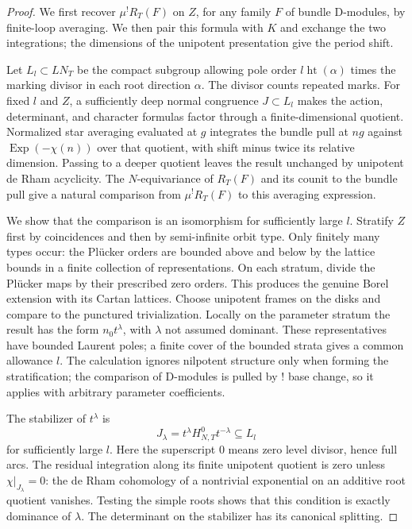 \begin{proof}
We first recover $\mu^!R_T(F)$ on $Z$, for any family $F$ of bundle
D-modules, by finite-loop averaging.  We then pair this formula with
$K$ and exchange the two integrations; the dimensions of the unipotent
presentation give the period shift.

Let $L_l\subset LN_T$ be the compact subgroup
allowing pole order $l\operatorname{ht}(\alpha)$ times the marking
divisor in each root direction $\alpha$.  The divisor counts repeated
marks.  For fixed $l$ and $Z$, a sufficiently deep normal congruence
$J\subset L_l$ makes the action, determinant, and character formulas
factor through a finite-dimensional quotient.  Normalized star
averaging evaluated at $g$ integrates the bundle pull at $ng$
against $\operatorname{Exp}(-\chi(n))$ over that quotient, with shift
minus twice its relative dimension.  Passing to a deeper quotient
leaves the result unchanged by unipotent de Rham acyclicity.  The
$N$-equivariance of $R_T(F)$ and its counit to the bundle pull give a
natural comparison from $\mu^!R_T(F)$ to this averaging expression.

We show that the comparison is an isomorphism for sufficiently large
$l$.  Stratify $Z$ first by coincidences and then by semi-infinite orbit
type.  Only finitely many types occur: the Pl\"ucker orders are bounded
above and below by the lattice bounds in a finite collection of
representations.  On each stratum, divide the Pl\"ucker maps by their
prescribed zero orders.  This produces the genuine Borel extension
with its Cartan lattices.  Choose unipotent frames on the disks and
compare to the punctured trivialization.  Locally on the parameter
stratum the result has the form $n_0t^\lambda$, with $\lambda$ not
assumed dominant.  These representatives have bounded Laurent poles;
a finite cover of the bounded strata gives a common allowance $l$.
The calculation ignores nilpotent structure only when forming the
stratification; the comparison of D-modules is pulled by $!$ base
change, so it applies with arbitrary parameter coefficients.

The stabilizer of $t^\lambda$ is
\[
 J_\lambda=t^\lambda H_{N,T}^0t^{-\lambda}\subseteq L_l
\]
for sufficiently large $l$.  Here the superscript $0$ means zero level
divisor, hence full arcs.  The residual integration along its finite
unipotent quotient is zero unless $\chi|_{J_\lambda}=0$: the de Rham
cohomology of a nontrivial exponential on an additive root quotient
vanishes.  Testing the simple roots shows that this condition is
exactly dominance of $\lambda$.  The determinant on the stabilizer
has its canonical splitting.


\end{proof}
